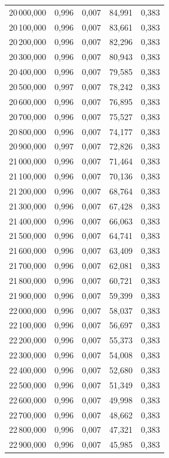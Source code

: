 \begin{longtable}{rrrrr}
20\,000,000 & 0,996 & 0,007 & 84,991 & 0,383\\
20\,100,000 & 0,996 & 0,007 & 83,661 & 0,383\\
20\,200,000 & 0,996 & 0,007 & 82,296 & 0,383\\
20\,300,000 & 0,996 & 0,007 & 80,943 & 0,383\\
20\,400,000 & 0,996 & 0,007 & 79,585 & 0,383\\
20\,500,000 & 0,997 & 0,007 & 78,242 & 0,383\\
20\,600,000 & 0,996 & 0,007 & 76,895 & 0,383\\
20\,700,000 & 0,996 & 0,007 & 75,527 & 0,383\\
20\,800,000 & 0,996 & 0,007 & 74,177 & 0,383\\
20\,900,000 & 0,997 & 0,007 & 72,826 & 0,383\\
21\,000,000 & 0,996 & 0,007 & 71,464 & 0,383\\
21\,100,000 & 0,996 & 0,007 & 70,136 & 0,383\\
21\,200,000 & 0,996 & 0,007 & 68,764 & 0,383\\
21\,300,000 & 0,996 & 0,007 & 67,428 & 0,383\\
21\,400,000 & 0,996 & 0,007 & 66,063 & 0,383\\
21\,500,000 & 0,996 & 0,007 & 64,741 & 0,383\\
21\,600,000 & 0,996 & 0,007 & 63,409 & 0,383\\
21\,700,000 & 0,996 & 0,007 & 62,081 & 0,383\\
21\,800,000 & 0,996 & 0,007 & 60,721 & 0,383\\
21\,900,000 & 0,996 & 0,007 & 59,399 & 0,383\\
22\,000,000 & 0,996 & 0,007 & 58,037 & 0,383\\
22\,100,000 & 0,996 & 0,007 & 56,697 & 0,383\\
22\,200,000 & 0,996 & 0,007 & 55,373 & 0,383\\
22\,300,000 & 0,996 & 0,007 & 54,008 & 0,383\\
22\,400,000 & 0,996 & 0,007 & 52,680 & 0,383\\
22\,500,000 & 0,996 & 0,007 & 51,349 & 0,383\\
22\,600,000 & 0,996 & 0,007 & 49,998 & 0,383\\
22\,700,000 & 0,996 & 0,007 & 48,662 & 0,383\\
22\,800,000 & 0,996 & 0,007 & 47,321 & 0,383\\
22\,900,000 & 0,996 & 0,007 & 45,985 & 0,383\\

\end{longtable}
